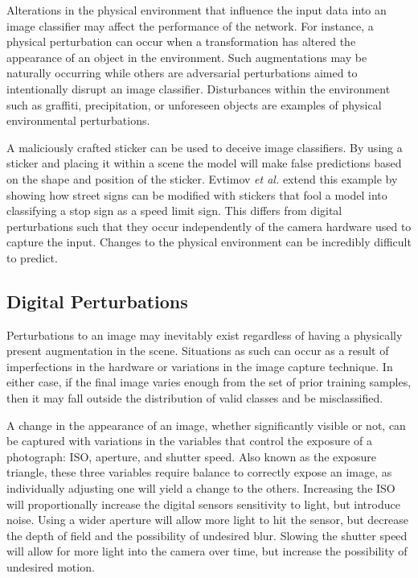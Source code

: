 \documentclass[conference]{IEEEtran}
\begin{document}
Alterations in the physical environment that influence the input data into an image classifier may affect the performance of the network. For instance, a physical perturbation can occur when a transformation has altered the appearance of an object in the environment. Such augmentations may be naturally occurring while others are adversarial perturbations aimed to intentionally disrupt an image classifier. Disturbances within the environment such as graffiti, precipitation, or unforeseen objects are examples of physical environmental perturbations. 

A maliciously crafted sticker \cite{adversarial-patch} can be used to deceive image classifiers. By using a sticker and placing it within a scene the model will make false predictions based on the shape and position of the sticker. Evtimov {\it et al.} \cite{robustphysical} extend this example by showing how street signs can be modified with stickers that fool a model into classifying a stop sign as a speed limit sign. This differs from digital perturbations such that they occur independently of the camera hardware used to capture the input. Changes to the physical environment can be incredibly difficult to predict.

\subsection{Digital Perturbations}

Perturbations to an image may inevitably exist regardless of having a physically present augmentation in the scene. Situations as such can occur as a result of imperfections in the hardware or variations in the image capture technique. In either case, if the final image varies enough from the set of prior training samples, then it may fall outside the distribution of valid classes and be misclassified.

A change in the appearance of an image, whether significantly visible or not, can be captured with variations in the variables that control the exposure of a photograph: ISO, aperture, and shutter speed. Also known as the exposure triangle, these three variables require balance to correctly expose an image, as individually adjusting one will yield a change to the others. Increasing the ISO will proportionally increase the digital sensors sensitivity to light, but introduce noise. Using a wider aperture will allow more light to hit the sensor, but decrease the depth of field and the possibility of undesired blur. Slowing the shutter speed will allow for more light into the camera over time, but increase the possibility of undesired motion. 
\end{document}
